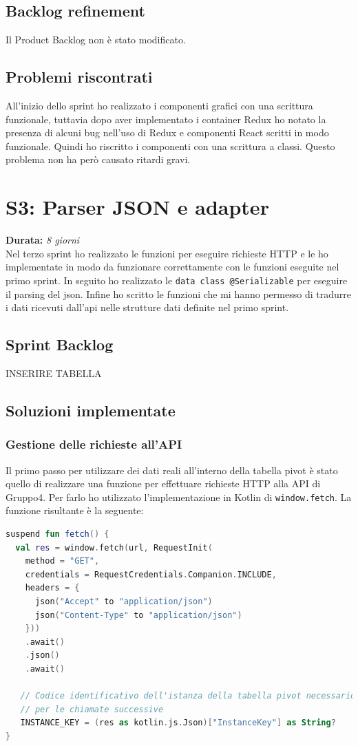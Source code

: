 \subsection{Backlog refinement}
Il Product Backlog non è stato modificato.

\subsection{Problemi riscontrati}
All'inizio dello sprint ho realizzato i componenti grafici con una scrittura funzionale, tuttavia dopo aver implementato i container Redux ho notato la presenza di alcuni bug nell'uso di Redux e componenti React scritti in modo funzionale. Quindi ho riscritto i componenti con una scrittura a classi. Questo problema non ha però causato ritardi gravi. 

\newpage

\section{S3: Parser JSON e adapter}
\textbf{Durata:} \textit{8 giorni} \\
Nel terzo sprint ho realizzato le funzioni per eseguire richieste HTTP e le ho implementate in modo da funzionare correttamente con le funzioni eseguite nel primo sprint. In seguito ho realizzato le \verb|data class @Serializable| per eseguire il parsing del json. Infine ho scritto le funzioni che mi hanno permesso di tradurre i dati ricevuti dall'api nelle strutture dati definite nel primo sprint.
 
\subsection{Sprint Backlog}
INSERIRE TABELLA

\subsection{Soluzioni implementate}
\subsubsection{Gestione delle richieste all'API}
Il primo passo per utilizzare dei dati reali all'interno della tabella pivot è stato quello di realizzare una funzione per effettuare richieste HTTP alla API di Gruppo4. Per farlo ho utilizzato l'implementazione in Kotlin di \verb|window.fetch|. La funzione risultante è la seguente:
\begin{lstlisting}[caption={Funzione fetch()}, label={lst:bodycells}, language=Kotlin]
suspend fun fetch() {
  val res = window.fetch(url, RequestInit(
    method = "GET",
    credentials = RequestCredentials.Companion.INCLUDE,
    headers = {
      json("Accept" to "application/json")
      json("Content-Type" to "application/json")
    }))
    .await()
    .json()
    .await()

   // Codice identificativo dell'istanza della tabella pivot necessario
   // per le chiamate successive
   INSTANCE_KEY = (res as kotlin.js.Json)["InstanceKey"] as String?
}
\end{lstlisting}

